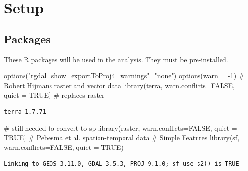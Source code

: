 \documentclass[
  letterpaper,
  DIV=11,
  numbers=noendperiod]{scrartcl}
\newenvironment{Shaded}{\begin{snugshade}}{\end{snugshade}}
\newcommand{\AttributeTok}[1]{\textcolor[rgb]{0.40,0.45,0.13}{#1}}
\newcommand{\CommentTok}[1]{\textcolor[rgb]{0.37,0.37,0.37}{#1}}
\newcommand{\ConstantTok}[1]{\textcolor[rgb]{0.56,0.35,0.01}{#1}}
\newcommand{\DecValTok}[1]{\textcolor[rgb]{0.68,0.00,0.00}{#1}}
\newcommand{\FunctionTok}[1]{\textcolor[rgb]{0.28,0.35,0.67}{#1}}
\newcommand{\NormalTok}[1]{\textcolor[rgb]{0.00,0.23,0.31}{#1}}
\newcommand{\OtherTok}[1]{\textcolor[rgb]{0.00,0.23,0.31}{#1}}
\newcommand{\SpecialCharTok}[1]{\textcolor[rgb]{0.37,0.37,0.37}{#1}}
\newcommand{\StringTok}[1]{\textcolor[rgb]{0.13,0.47,0.30}{#1}}
\begin{document}
\hypertarget{setup}{%
\section{Setup}\label{setup}}

\hypertarget{packages}{%
\subsection{Packages}\label{packages}}

These R packages will be used in the analysis. They must be
pre-installed.

\begin{Shaded}
\begin{Highlighting}[]
\FunctionTok{options}\NormalTok{(}\StringTok{"rgdal\_show\_exportToProj4\_warnings"}\OtherTok{=}\StringTok{"none"}\NormalTok{)}
\FunctionTok{options}\NormalTok{(}\AttributeTok{warn =} \SpecialCharTok{{-}}\DecValTok{1}\NormalTok{)}
\CommentTok{\# Robert Hijmans raster and vector data}
\FunctionTok{library}\NormalTok{(terra, }\AttributeTok{warn.conflicts=}\ConstantTok{FALSE}\NormalTok{, }\AttributeTok{quiet =} \ConstantTok{TRUE}\NormalTok{) }\CommentTok{\# replaces \textasciigrave{}raster\textasciigrave{}}
\end{Highlighting}
\end{Shaded}

\begin{verbatim}
terra 1.7.71
\end{verbatim}

\begin{Shaded}
\begin{Highlighting}[]
\CommentTok{\# still needed to convert to \textasciigrave{}sp\textasciigrave{}}
\FunctionTok{library}\NormalTok{(raster, }\AttributeTok{warn.conflicts=}\ConstantTok{FALSE}\NormalTok{, }\AttributeTok{quiet =} \ConstantTok{TRUE}\NormalTok{) }
\CommentTok{\# Pebesma et al. spation{-}temporal data}
\CommentTok{\# Simple Features}
\FunctionTok{library}\NormalTok{(sf, }\AttributeTok{warn.conflicts=}\ConstantTok{FALSE}\NormalTok{, }\AttributeTok{quiet =} \ConstantTok{TRUE}\NormalTok{)          }
\end{Highlighting}
\end{Shaded}

\begin{verbatim}
Linking to GEOS 3.11.0, GDAL 3.5.3, PROJ 9.1.0; sf_use_s2() is TRUE
\end{verbatim}
\end{document}

